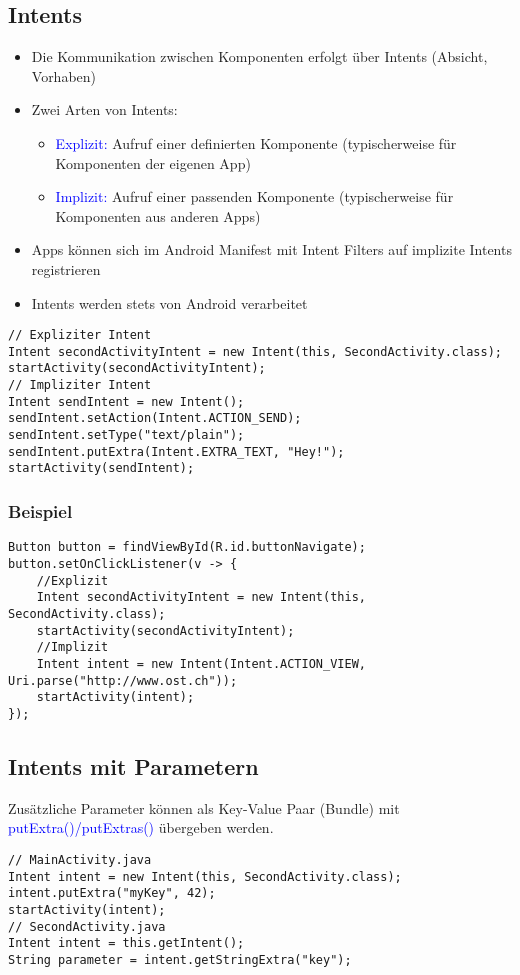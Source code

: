 \subsection{Intents}
\begin{itemize}[topsep=0pt, leftmargin=4mm]
    \setlength\itemsep{-0.3em}
    \item Die Kommunikation zwischen Komponenten erfolgt über Intents (Absicht, Vorhaben)
    \item Zwei Arten von Intents:
    \begin{itemize}[topsep=0pt, leftmargin=4mm]
        \setlength\itemsep{-0.3em}
        \item \textcolor{blue}{Explizit:} Aufruf einer definierten Komponente (typischerweise für Komponenten der eigenen App)
        \item \textcolor{blue}{Implizit:} Aufruf einer passenden Komponente (typischerweise für Komponenten aus anderen Apps)
    \end{itemize}
    \item Apps können sich im Android Manifest mit Intent Filters auf implizite Intents registrieren
    \item Intents werden stets von Android verarbeitet
\end{itemize}
\begin{lstlisting}
// Expliziter Intent
Intent secondActivityIntent = new Intent(this, SecondActivity.class);
startActivity(secondActivityIntent);
// Impliziter Intent
Intent sendIntent = new Intent();
sendIntent.setAction(Intent.ACTION_SEND);
sendIntent.setType("text/plain");
sendIntent.putExtra(Intent.EXTRA_TEXT, "Hey!");
startActivity(sendIntent);
\end{lstlisting}
\subsubsection{Beispiel}
\begin{lstlisting}
Button button = findViewById(R.id.buttonNavigate);
button.setOnClickListener(v -> {
    //Explizit
    Intent secondActivityIntent = new Intent(this, SecondActivity.class);
    startActivity(secondActivityIntent);
    //Implizit
    Intent intent = new Intent(Intent.ACTION_VIEW, Uri.parse("http://www.ost.ch"));
    startActivity(intent);
});
\end{lstlisting}
\subsection{Intents mit Parametern}
Zusätzliche Parameter können als Key-Value Paar (Bundle) mit \textcolor{blue}{putExtra()/putExtras()} übergeben werden.
\begin{lstlisting}
// MainActivity.java
Intent intent = new Intent(this, SecondActivity.class);
intent.putExtra("myKey", 42);
startActivity(intent);
// SecondActivity.java
Intent intent = this.getIntent();
String parameter = intent.getStringExtra("key");
\end{lstlisting}
